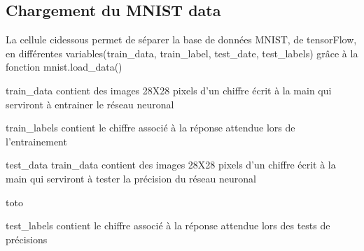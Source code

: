 \documentclass[letterpaper,10pt,french]{sphinxmanual}
\begin{document}
\subsection{Chargement du MNIST data}
\label{\detokenize{OCR_SAM:chargement-du-mnist-data}}
La cellule ci\sphinxhyphen{}dessous permet de séparer la base de données MNIST, de tensorFlow, en différentes variables(train\_data, train\_label, test\_date, test\_labels) grâce à la fonction mnist.load\_data()

train\_data contient des images 28X28 pixels d’un chiffre écrit à la main qui serviront à entrainer le réseau neuronal

\begin{sphinxVerbatim}[commandchars=\\\{\}]
\end{sphinxVerbatim}

train\_labels contient le chiffre associé à la réponse attendue lors de l’entrainement

test\_data train\_data contient des images 28X28 pixels d’un chiffre écrit à la main qui serviront à tester la précision du réseau neuronal

\begin{sphinxVerbatim}[commandchars=\\\{\}]
\end{sphinxVerbatim}

\begin{sphinxVerbatim}[commandchars=\\\{\}]
toto
\end{sphinxVerbatim}

test\_labels contient le chiffre associé à la réponse attendue lors des tests de précisions

\begin{sphinxVerbatim}[commandchars=\\\{\}]
     
  \PYG{p}{[} \PYG{p}{]}
  \PYG{p}{[} \PYG{p}{]}
\end{sphinxVerbatim}
\end{document}
